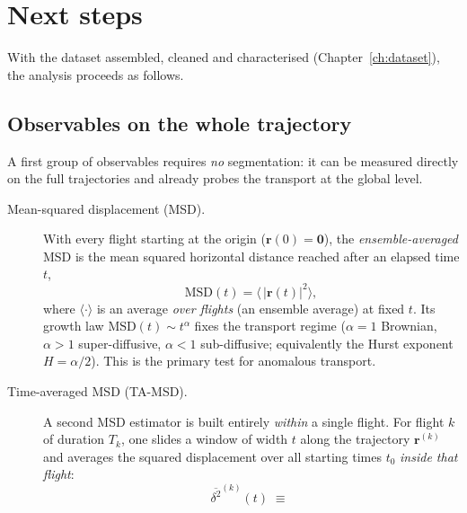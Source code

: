 \chapter{Next steps}
\label{ch:next-steps}

With the dataset assembled, cleaned and characterised (Chapter~\ref{ch:dataset}),
the analysis proceeds as follows.

\section{Observables on the whole trajectory}
\label{sec:obs-global}
A first group of observables requires \emph{no} segmentation: it can be measured directly on
the full trajectories and already probes the transport at the global level.

\begin{description}
  \item[Mean-squared displacement (MSD).] With every flight starting at the origin
        ($\mathbf{r}(0)=\mathbf{0}$), the \emph{ensemble-averaged} MSD is the mean squared
        horizontal distance reached after an elapsed time $t$,
        \begin{equation}
          \mathrm{MSD}(t)=\big\langle\,|\mathbf{r}(t)|^2\big\rangle,
        \end{equation}
        where $\langle\cdot\rangle$ is an average \emph{over flights} (an ensemble average) at
        fixed $t$. Its growth law
        $\mathrm{MSD}(t)\sim t^{\alpha}$ fixes the transport regime ($\alpha=1$ Brownian,
        $\alpha>1$ super-diffusive, $\alpha<1$ sub-diffusive; equivalently the Hurst exponent
        $H=\alpha/2$). This is the primary test for anomalous transport. 
  \item[Time-averaged MSD (TA-MSD).] A second MSD estimator is built entirely
        \emph{within} a single flight. For flight $k$ of duration $T_k$, one slides a window
        of width $t$ along the trajectory $\mathbf{r}^{(k)}$ and averages the squared
        displacement over all starting times $t_0$ \emph{inside that flight}:
        \begin{equation}
          \overline{\delta^2}^{(k)}(t)\;\equiv\;

\end{equation}
\end{description}
